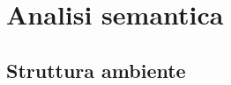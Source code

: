 \documentclass[../main.tex]{subfiles}
\begin{document}
\chapter{Analisi semantica}\label{c:analisi-semantica}
\section{Struttura ambiente}\label{s:struttura-ambiente}
\end{document}
